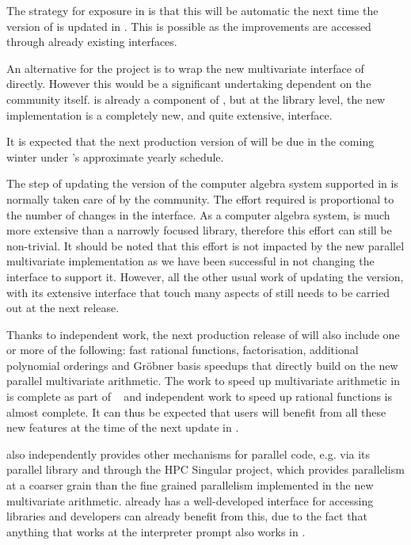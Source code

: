 \documentclass{deliverablereport}
\begin{document}
The strategy for exposure in \SageMath is that this will be automatic the next time the
version of \Singular is updated in \SageMath. This is possible as the improvements are accessed
through already existing interfaces.

An alternative for the \SageMath project is to wrap the new multivariate interface of \FLINT
directly. However this would be a significant undertaking dependent on the \SageMath
community itself. \FLINT is already a component of \Sage, but at the library level, the new
implementation is a completely new, and quite extensive, interface.

It is expected that the next production version of \Singular will be due in the coming winter
under \Singular's approximate yearly schedule.

The step of updating the version of the \Singular computer algebra system supported in \SageMath
is normally taken care of by the \SageMath community. The effort required is proportional to the
number of changes in the \Singular interface. As a computer algebra system, \Singular is
much more extensive than a narrowly focused library, therefore this effort can still be non-trivial.
It should be noted that this effort is not impacted by the new parallel multivariate implementation
as we have been successful in not changing the \Singular interface to support it. However, all
the other usual work of updating the \Singular version, with its extensive interface that touch
many aspects of \SageMath still needs to be carried out at the next release.

Thanks to independent work, the next production release of \Singular will also include one or
more of the following: fast rational functions, factorisation, additional polynomial orderings
and Gr\"{o}bner basis speedups that directly build on the new parallel multivariate arithmetic.
The work to speed up multivariate arithmetic in \Singular is complete as part of
~ and independent work to speed up rational functions is almost
complete. It can thus be expected that \SageMath users will benefit from all these new features at
the time of the next \Singular update in \SageMath.

\Singular also independently provides other mechanisms for parallel code, e.g. via its parallel
library and through the HPC Singular project, which provides parallelism at a coarser grain than
the fine grained parallelism implemented in the new multivariate arithmetic. \SageMath already
has a well-developed interface for accessing \Singular libraries and \SageMath developers can already
benefit from this, due to the fact that anything that works at the \Singular interpreter prompt
also works in \SageMath.
\end{document}
